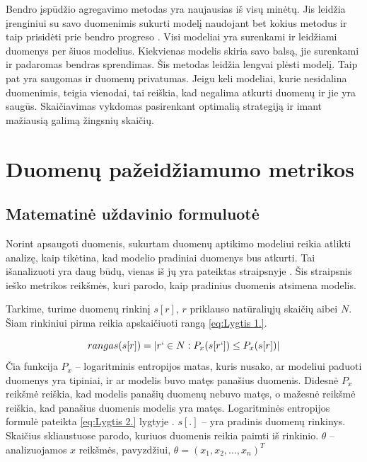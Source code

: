 \documentclass{VUMIFInfBakalaurinis}
\begin{document}
\par Bendro įspūdžio agregavimo metodas yra naujausias iš visų minėtų. Jis leidžia įrenginiui su savo duomenimis sukurti modelį naudojant bet kokius metodus ir taip prisidėti prie bendro progreso \cite{6}. Visi modeliai yra surenkami ir leidžiami duomenys per šiuos modelius. Kiekvienas modelis skiria savo balsą, jie surenkami ir padaromas bendras sprendimas. Šis metodas leidžia lengvai plėsti modelį. Taip pat yra saugomas ir duomenų privatumas. Jeigu keli modeliai, kurie nesidalina duomenimis, teigia vienodai, tai reiškia, kad negalima atkurti duomenų ir jie yra saugūs. Skaičiavimas vykdomas pasirenkant optimalią strategiją ir imant mažiausią galimą žingsnių skaičių.





\section{Duomenų pažeidžiamumo metrikos}

\subsection{Matematinė uždavinio formuluotė}
\par Norint apsaugoti duomenis, sukurtam duomenų aptikimo modeliui reikia atlikti analizę, kaip tikėtina, kad modelio pradiniai duomenys bus atkurti. Tai išanalizuoti yra daug būdų, vienas iš jų yra pateiktas straipsnyje \cite{11}.
 Šis straipsnis ieško metrikos reikšmės, kuri parodo, kaip pradinius duomenis atsimena modelis.
\par Tarkime, turime duomenų rinkinį $s[r]$, $r$ priklauso natūraliųjų skaičių aibei $N$. Šiam rinkiniui pirma reikia apskaičiuoti rangą \eqref{eq:Lygtis 1.}.

\begin{equation}
rangas(s[r]) = | {r` \in N : P_{x}(s[r`]) \leq P_{x}(s[r])} |
\label{eq:Lygtis 1.}
\end{equation}
Čia funkcija $P_{x}$ -- logaritminis entropijos matas, kuris nusako, ar modeliui paduoti duomenys yra tipiniai, ir ar modelis buvo matęs panašius duomenis. Didesnė $P_{x}$ reikšmė reiškia, kad modelis panašių duomenų nebuvo matęs, o mažesnė reikšmė reiškia, kad panašius duomenis modelis yra matęs. Logaritminės entropijos formulė pateikta \eqref{eq:Lygtis 2.} lygtyje . $s[.]$ -- yra pradinis duomenų rinkinys. Skaičius skliaustuose parodo, kuriuos duomenis reikia paimti iš rinkinio. $\theta$ -- analizuojamos $x$ reikšmės, pavyzdžiui, $\theta = (x_{1}, x_{2}, ..., x_{n})^{T}$ 
\end{document}
